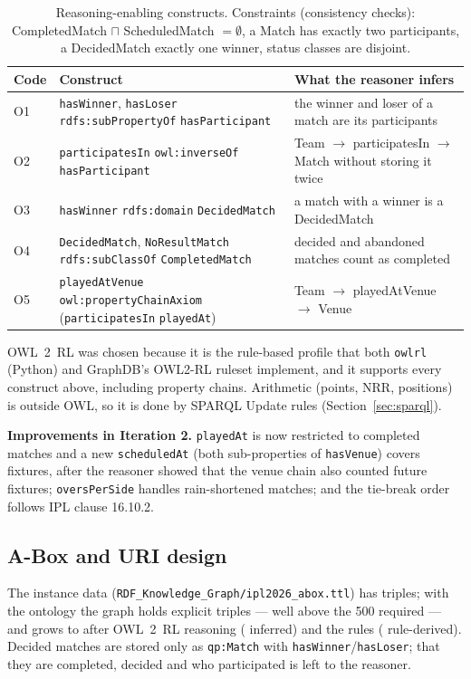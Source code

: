 \begin{table}[H]\centering\small
\begin{tabular}{p{0.7cm}p{6.6cm}p{7.6cm}}
\toprule
\textbf{Code} & \textbf{Construct} & \textbf{What the reasoner infers} \\ \midrule
O1 & \texttt{hasWinner}, \texttt{hasLoser} \texttt{rdfs:subPropertyOf} \texttt{hasParticipant} & the winner and loser of a match are its participants \\
O2 & \texttt{participatesIn} \texttt{owl:inverseOf} \texttt{hasParticipant} & Team $\rightarrow$ participatesIn $\rightarrow$ Match without storing it twice \\
O3 & \texttt{hasWinner} \texttt{rdfs:domain} \texttt{DecidedMatch} & a match with a winner is a DecidedMatch \\
O4 & \texttt{DecidedMatch}, \texttt{NoResultMatch} \texttt{rdfs:subClassOf} \texttt{CompletedMatch} & decided and abandoned matches count as completed \\
O5 & \texttt{playedAtVenue} \texttt{owl:propertyChainAxiom} (\texttt{participatesIn} \texttt{playedAt}) & Team $\rightarrow$ playedAtVenue $\rightarrow$ Venue \\
\bottomrule
\end{tabular}
\caption{Reasoning-enabling constructs. Constraints (consistency checks): CompletedMatch $\sqcap$ ScheduledMatch
$=\emptyset$, a Match has exactly two participants, a DecidedMatch exactly one winner, status classes are
disjoint.}
\end{table}

OWL~2~RL \citep{w3c2012owl2profiles} was chosen because it is the rule-based profile that both
\texttt{owlrl} (Python) and GraphDB's OWL2-RL ruleset implement, and it supports every construct above,
including property chains. Arithmetic (points, NRR, positions) is outside OWL, so it is done by SPARQL Update
rules (Section~\ref{sec:sparql}).

\textbf{Improvements in Iteration 2.} \texttt{playedAt} is now restricted to completed matches and a new
\texttt{scheduledAt} (both sub-properties of \texttt{hasVenue}) covers fixtures, after the reasoner showed that
the venue chain also counted future fixtures; \texttt{oversPerSide} handles rain-shortened matches; and the
tie-break order follows IPL clause 16.10.2.

\subsection{A-Box and URI design}
The instance data (\texttt{RDF\_Knowledge\_Graph/ipl2026\_abox.ttl}) has \statAbox{} triples; with the
ontology the graph holds \statExplicit{} explicit triples --- well above the 500 required --- and grows to
\statFull{} after OWL~2~RL reasoning (\statInferred{} inferred) and the rules (\statRule{} rule-derived).
Decided matches are stored only as \texttt{qp:Match} with \texttt{hasWinner}/\texttt{hasLoser}; that they are
completed, decided and who participated is left to the reasoner.


